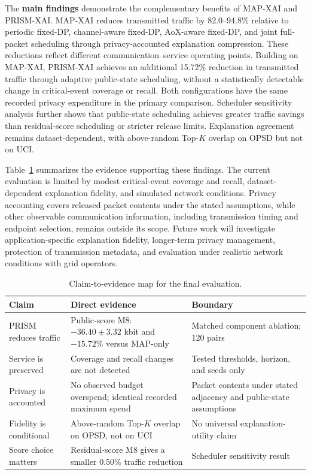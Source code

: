 \documentclass[conference]{IEEEtran}
\begin{document}
The \textbf{main findings} demonstrate the
complementary benefits of MAP-XAI and PRISM-XAI.
MAP-XAI reduces transmitted traffic by
82.0--94.8\% relative to periodic fixed-DP,
channel-aware fixed-DP, AoX-aware fixed-DP,
and joint full-packet scheduling through
privacy-accounted explanation compression.
These reductions reflect different
communication--service operating points.
Building on MAP-XAI, PRISM-XAI achieves an
additional 15.72\% reduction in transmitted
traffic through adaptive public-state scheduling,
without a statistically detectable change in
critical-event coverage or recall. Both
configurations have the same recorded privacy
expenditure in the primary comparison.
Scheduler sensitivity analysis further shows
that public-state scheduling achieves greater
traffic savings than residual-score scheduling
or stricter release limits. Explanation agreement
remains dataset-dependent, with above-random
Top-$K$ overlap on OPSD but not on UCI.

Table~\ref{tab:claims} summarizes the evidence
supporting these findings. The current evaluation
is limited by modest critical-event coverage
and recall, dataset-dependent explanation fidelity,
and simulated network conditions. Privacy
accounting covers released packet contents under
the stated assumptions, while other observable
communication information, including transmission
timing and endpoint selection, remains outside
its scope. Future work will investigate
application-specific explanation fidelity,
longer-term privacy management, protection of
transmission metadata, and evaluation under
realistic network conditions with grid operators.



\begin{table}[t]
\caption{Claim-to-evidence map for the final evaluation.}
\label{tab:claims}
\centering
\scriptsize
\setlength{\tabcolsep}{2.7pt}
\begin{tabular}{p{}p{}p{}}
\toprule
Claim & Direct evidence & Boundary\\
\midrule
PRISM reduces traffic & Public-score M8: $-36.40\pm3.32$ kbit and $-15.72\%$ versus MAP-only & Matched component ablation; 120 pairs\\
Service is preserved & Coverage and recall changes are not detected & Tested thresholds, horizon, and seeds only\\
Privacy is accounted & No observed budget overspend; identical recorded maximum spend & Packet contents under stated adjacency and public-state assumptions\\
Fidelity is conditional & Above-random Top-$K$ overlap on OPSD, not on UCI & No universal explanation-utility claim\\
Score choice matters & Residual-score M8 gives a smaller $0.50\%$ traffic reduction & Scheduler sensitivity result\\
\bottomrule
\end{tabular}
\end{table}
\end{document}
